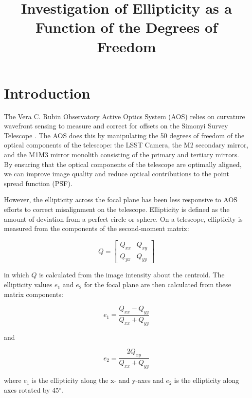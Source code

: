 \documentclass[SE,lsstdraft,authoryear,toc]{lsstdoc}
\title{Investigation of Ellipticity as a Function of the Degrees of Freedom}
\date{\vcsDate}
\begin{document}
\mkshorttitle  %

\section{Introduction}

The Vera C. Rubin Observatory Active Optics System (AOS) relies on curvature wavefront sensing to measure and correct for offsets on the Simonyi Survey Telescope \cite{Xin2015}. 
The AOS does this by manipulating the 50 degrees of freedom of the optical components of the telescope: the LSST Camera, the M2 secondary mirror, and the M1M3 mirror monolith consisting of the primary and tertiary mirrors. 
By ensuring that the optical components of the telescope are optimally aligned, we can improve image quality and reduce optical contributions to the point spread function (PSF). 

However, the ellipticity across the focal plane has been less responsive to AOS efforts to correct misalignment on the telescope. 
Ellipticity is defined as the amount of deviation from a perfect circle or sphere. 
On a telescope, ellipticity is measured from the components of the second-moment matrix:

\begin{equation}
    Q = \begin{bmatrix} Q_{xx} & Q_{xy} \\ Q_{yx} & Q_{yy} \end{bmatrix}
\end{equation}

in which $Q$ is calculated from the image intensity about the centroid. 
The ellipticity values $e_{1}$ and $e_{2}$ for the focal plane are then calculated from these matrix components:

\begin{equation}
    e_{1} = \frac{Q_{xx}-Q_{yy}}{Q_{xx}+Q_{yy}}
\end{equation}

and

\begin{equation}
    e_{2} = \frac{2 Q_{xy}}{Q_{xx}+Q_{yy}}
\end{equation}

where $e_{1}$ is the ellipticity along the x- and y-axes and $e_{2}$ is the ellipticity along axes rotated by 45$^{\circ}$. 
\end{document}
